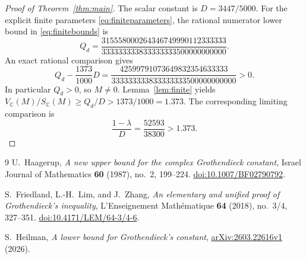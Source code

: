 \documentclass[11pt]{article}
\theoremstyle{remark}\newtheorem{remark}[theorem]{Remark}
\newcommand{\C}{\mathbb C}
\begin{document}
\begin{proof}[Proof of Theorem~\ref{thm:main}]
The scalar constant is \(D=3447/5000\). For the explicit finite
parameters \eqref{eq:finiteparameters}, the rational numerator lower
bound in \eqref{eq:finitebounds} is
\[
Q_d=\frac{315558000264346749990112333333}
{333333333833333333500000000000}.
\]
An exact rational comparison gives
\[
Q_d-\frac{1373}{1000}D
=\frac{42599791073649832354633333}
{333333333833333333500000000000}>0.
\]
In particular \(Q_d>0\), so \(M\ne0\). Lemma~\ref{lem:finite}
yields
\(V_{\C}(M)/S_{\C}(M)\ge Q_d/D>1373/1000=1.373\).
The corresponding limiting comparison is
\[
\frac{1-\lambda}{D}=\frac{52593}{38300}>1.373.
\]
\end{proof}

\begin{thebibliography}{9}
U.~Haagerup, \emph{A new upper bound for the complex Grothendieck
constant}, Israel Journal of Mathematics \textbf{60} (1987), no.~2,
199--224. \href{https://doi.org/10.1007/BF02790792}{doi:10.1007/BF02790792}.

S.~Friedland, L.-H.~Lim, and J.~Zhang,
\emph{An elementary and unified proof of Grothendieck's inequality},
L'Enseignement Math\'ematique \textbf{64} (2018), no.~3/4, 327--351.
\href{https://doi.org/10.4171/LEM/64-3/4-6}{doi:10.4171/LEM/64-3/4-6}.

S.~Heilman, \emph{A lower bound for Grothendieck's constant},
\href{https://arxiv.org/abs/2603.22616v1}{arXiv:2603.22616v1} (2026).
\end{thebibliography}
\end{document}
